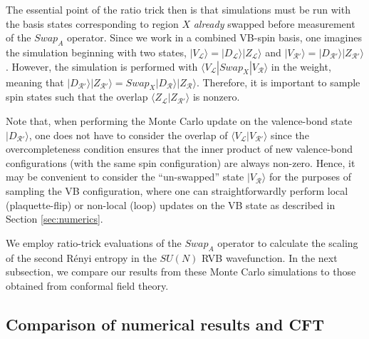 \documentclass[11pt]{iopart}
\begin{document}
The essential point of the ratio trick then is that simulations must be run with the basis states corresponding to region $X$ {\it already} swapped before measurement of the $Swap_A$ operator.  Since we work in a combined VB-spin basis, one imagines the simulation beginning with 
two states, $|V_{\mathcal L} \rangle = |D_{\mathcal L} \rangle | Z_{\mathcal L} \rangle$ and $|V_{\mathcal R'} \rangle = |D_{\mathcal R'}  \rangle | Z_{\mathcal R'} \rangle$.  However, the simulation is performed with ${\langle V_{\mathcal{L}} | Swap_X | V_{\mathcal{R}} \rangle}$ in the weight, 
meaning that $ |D_{\mathcal R'} \rangle | Z_{\mathcal R'} \rangle = Swap_X |D_{\mathcal R} \rangle | Z_{\mathcal R} \rangle  $.  Therefore, it is important to sample spin states such that the overlap $\langle Z_{\mathcal L} | Z_{\mathcal R '} \rangle$ is nonzero.  

Note that, when performing the Monte Carlo update on the valence-bond state $| D_{\mathcal{R} '} \rangle$, one does not have to consider the overlap of $\langle V_{\mathcal{L}} | V_{\mathcal{R}'} \rangle$ since the overcompleteness condition ensures that the inner product of new valence-bond configurations (with the same spin configuration) are always non-zero.  Hence, it may be convenient to consider the ``un-swapped'' state $|V_{\mathcal R} \rangle$ for the purposes of sampling the VB configuration, where one can straightforwardly perform local (plaquette-flip) or non-local (loop) updates on the VB state as described in 
Section \ref{sec:numerics}.

We employ ratio-trick evaluations of the $Swap_A$ operator to calculate the scaling of the second Rényi entropy in the $SU(N)$ RVB wavefunction.  In the next subsection, we compare our results from these Monte Carlo simulations to those obtained from conformal field theory.


\subsection{Comparison of numerical results and CFT}
\end{document}
